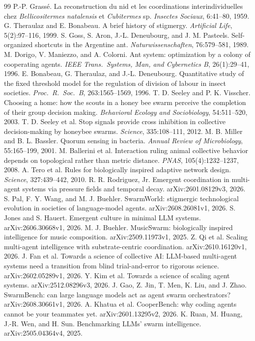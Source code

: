 \documentclass[10pt,twocolumn]{article}
\begin{document}
{\small
\begin{thebibliography}{99}\setlength{\itemsep}{0.15em}
 P.-P. Grass\'e. La reconstruction du nid et les coordinations interindividuelles chez \emph{Bellicositermes natalensis} et \emph{Cubitermes} sp. \emph{Insectes Sociaux}, 6:41--80, 1959.
 G. Theraulaz and E. Bonabeau. A brief history of stigmergy. \emph{Artificial Life}, 5(2):97--116, 1999.
 S. Goss, S. Aron, J.-L. Deneubourg, and J. M. Pasteels. Self-organized shortcuts in the Argentine ant. \emph{Naturwissenschaften}, 76:579--581, 1989.
 M. Dorigo, V. Maniezzo, and A. Colorni. Ant system: optimization by a colony of cooperating agents. \emph{IEEE Trans.\ Systems, Man, and Cybernetics B}, 26(1):29--41, 1996.
 E. Bonabeau, G. Theraulaz, and J.-L. Deneubourg. Quantitative study of the fixed threshold model for the regulation of division of labour in insect societies. \emph{Proc.\ R.\ Soc.\ B}, 263:1565--1569, 1996.
 T. D. Seeley and P. K. Visscher. Choosing a home: how the scouts in a honey bee swarm perceive the completion of their group decision making. \emph{Behavioral Ecology and Sociobiology}, 54:511--520, 2003.
 T. D. Seeley et al. Stop signals provide cross inhibition in collective decision-making by honeybee swarms. \emph{Science}, 335:108--111, 2012.
 M. B. Miller and B. L. Bassler. Quorum sensing in bacteria. \emph{Annual Review of Microbiology}, 55:165--199, 2001.
 M. Ballerini et al. Interaction ruling animal collective behavior depends on topological rather than metric distance. \emph{PNAS}, 105(4):1232--1237, 2008.
 A. Tero et al. Rules for biologically inspired adaptive network design. \emph{Science}, 327:439--442, 2010.
 R. R. Rodriguez, Jr. Emergent coordination in multi-agent systems via pressure fields and temporal decay. arXiv:2601.08129v3, 2026.
 S. Pal, F. Y. Wang, and M. J. Buehler. SwarmWorld: stigmergic technological evolution in societies of language-model agents. arXiv:2608.26081v1, 2026.
 S. Jones and S. Hauert. Emergent culture in minimal LLM systems. arXiv:2606.30668v1, 2026.
 M. J. Buehler. MusicSwarm: biologically inspired intelligence for music composition. arXiv:2509.11973v1, 2025.
 Z. Qi et al. Scaling multi-agent intelligence with substrate-centric coordination. arXiv:2610.16120v1, 2026.
 J. Fan et al. Towards a science of collective AI: LLM-based multi-agent systems need a transition from blind trial-and-error to rigorous science. arXiv:2602.05289v1, 2026.
 Y. Kim et al. Towards a science of scaling agent systems. arXiv:2512.08296v3, 2026.
 J. Gao, Z. Jin, T. Men, K. Liu, and J. Zhao. SwarmBench: can large language models act as agent swarm orchestrators? arXiv:2608.30661v1, 2026.
 A. Khatua et al. CooperBench: why coding agents cannot be your teammates yet. arXiv:2601.13295v2, 2026.
 K. Ruan, M. Huang, J.-R. Wen, and H. Sun. Benchmarking LLMs' swarm intelligence. arXiv:2505.04364v4, 2025.
\end{thebibliography}
}
\end{document}
